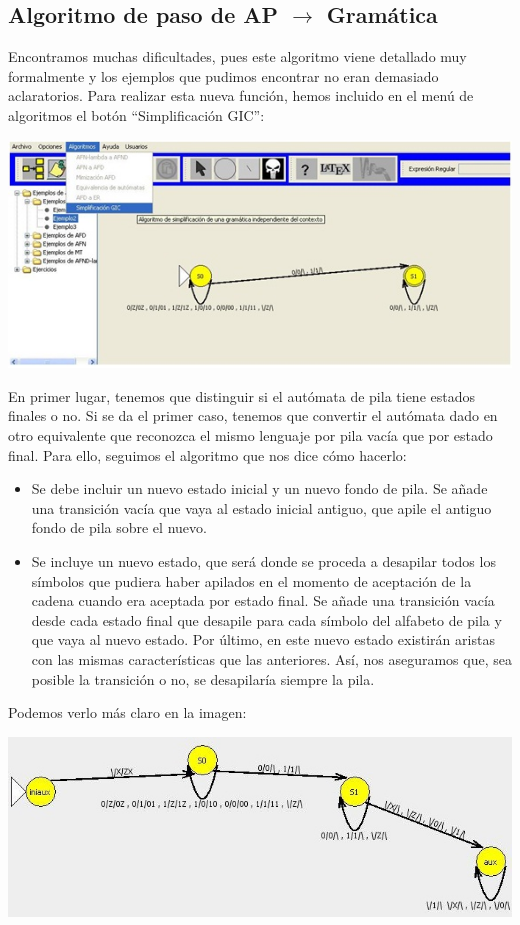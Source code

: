 \documentclass[12pt,a4paper,spanish]{book}
\begin{document}
\subsection{Algoritmo de paso de AP $\rightarrow$ Gram\'atica}
Encontramos muchas dificultades, pues este algoritmo viene detallado muy formalmente y los ejemplos que pudimos encontrar no eran demasiado aclaratorios.
Para realizar esta nueva funci\'on, hemos incluido en el men\'u de algoritmos el bot\'on ``Simplificaci\'on GIC'':\\
\begin{center}
\includegraphics{auto4.jpg}
\end{center}
En primer lugar, tenemos que distinguir si el aut\'omata de pila tiene estados finales o no. Si se da el primer caso, tenemos que convertir el aut\'omata dado en otro equivalente que reconozca el mismo lenguaje por pila vac\'ia que por estado final. Para ello, seguimos el algoritmo que nos dice c\'omo hacerlo:
\begin{itemize}
\item Se debe incluir un nuevo estado inicial y un nuevo fondo de pila. Se a\~nade una transici\'on vac\'ia que vaya al estado inicial antiguo, que apile el antiguo fondo de pila sobre el nuevo.
\newpage
\item Se incluye un nuevo estado, que ser\'a donde se proceda a desapilar todos los s\'imbolos que pudiera haber apilados en el momento de aceptaci\'on de la cadena cuando era aceptada por estado final. Se a\~nade una transici\'on vac\'ia desde cada estado final que desapile para cada s\'imbolo del alfabeto de pila y que vaya al nuevo estado. Por \'ultimo, en este nuevo estado existir\'an aristas con las mismas caracter\'isticas que las anteriores. As\'i, nos aseguramos que, sea posible la transici\'on o no, se desapilar\'ia siempre la pila.\\
\end{itemize}
Podemos verlo m\'as claro en la imagen:\\
\begin{center}
\includegraphics{roci1.jpg}
\end{center}
\end{document}
